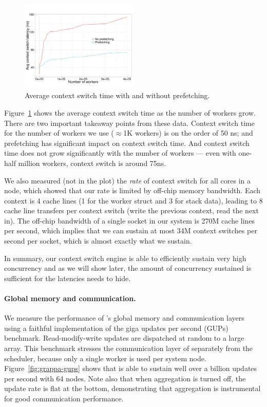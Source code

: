 \begin{figure}[ht]
    \begin{center}
      \includegraphics[width=0.5\textwidth]{figs/context_switch_time.pdf}
    \end{center}
    \caption{Average context switch time with and without prefetching.}
    \label{fig:context-switch-exp}
\end{figure}

Figure~\ref{fig:context-switch-exp} shows the average context switch time as
the number of workers grow. There are two important takeaway points from these
data. Context switch time for the number of workers we use ($\approx$1K workers) is
on the order of 50 ns; and prefetching has significant impact on context
switch time. And context switch time does not grow significantly with the
number of workers --- even with one-half million workers, context switch
is around 75ns.

We also measured (not in the plot) the \emph{rate} of context switch for all
cores in a node, which showed that our rate is limited by off-chip memory
bandwidth. Each context is 4 cache lines (1 for the worker struct and 3 for
stack data), leading to 8 cache line transfers per context switch
(write the previous context, read the next in). The off-chip bandwidth of a
single socket in our system is 270M cache lines per second, which implies that
we can sustain at most 34M context switches per second per socket, which is
almost exactly what we sustain.

In summary, our context switch engine is able to efficiently sustain very high
concurrency and as we will show later, the amount of concurrency sustained is
sufficient for the latencies \Grappa needs to hide.

\paragraph{Global memory and communication.} We measure the performance of
\Grappa's global memory and communication layers using a faithful
implementation of the giga updates per second (GUPs) benchmark.
Read-modify-write updates are dispatched at random to a large array. This
benchmark stresses the communication layer of \Grappa separately from the
scheduler, because only a single worker is used per system node.
Figure~\ref{fig:grappa-gups} shows that \Grappa is able to sustain well over a
billion updates per second with 64 nodes. Note also that when aggregation is turned off, the update rate is flat at the bottom, demonstrating that aggregation is instrumental for good communication performance.

